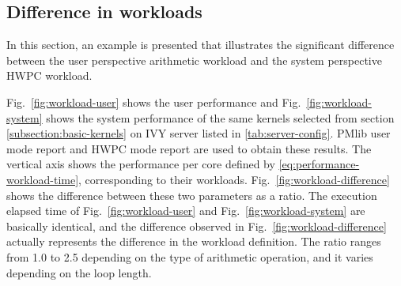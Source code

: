 \documentclass[conference]{IEEEtran}
\begin{document}
%
\subsection{Difference in workloads}
\label{subsection:difference-in-workloads}

In this section, an example is presented that illustrates the significant
difference between the user perspective arithmetic workload and
the system perspective HWPC workload.

Fig.~\ref{fig:workload-user} shows the user performance
and Fig.~\ref{fig:workload-system} shows the system performance
of the same kernels selected from section \ref{subsection:basic-kernels}
on IVY server listed in \ref{tab:server-config}.
PMlib user mode report and HWPC mode report are used to obtain these results.
The vertical axis shows the performance per core
defined by \eqref{eq:performance-workload-time},
corresponding to their workloads.
Fig.~\ref{fig:workload-difference} shows the difference between these two
parameters as a ratio.
%
%
The execution elapsed time
of Fig.~\ref{fig:workload-user} and Fig.~\ref{fig:workload-system} are
basically identical, and the difference observed in
Fig.~\ref{fig:workload-difference} 
actually represents the difference in the workload definition.
The ratio ranges from 1.0 to 2.5 depending on the type of
arithmetic operation, and it varies depending on the loop length.
\end{document}
